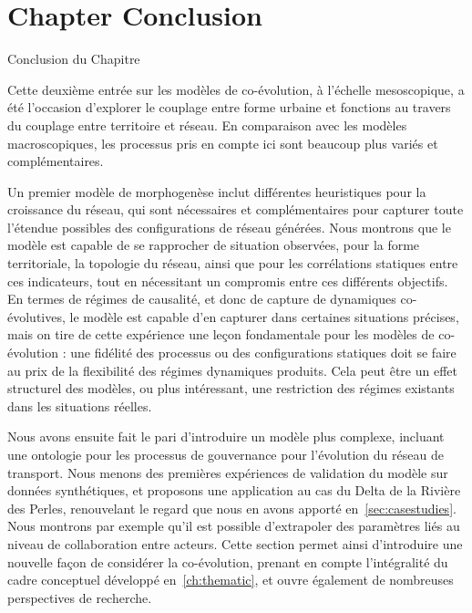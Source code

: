 

\newpage


\section*{Chapter Conclusion}{Conclusion du Chapitre}


Cette deuxième entrée sur les modèles de co-évolution, à l'échelle mesoscopique, a été l'occasion d'explorer le couplage entre forme urbaine et fonctions au travers du couplage entre territoire et réseau. En comparaison avec les modèles macroscopiques, les processus pris en compte ici sont beaucoup plus variés et complémentaires.

Un premier modèle de morphogenèse inclut différentes heuristiques pour la croissance du réseau, qui sont nécessaires et complémentaires pour capturer toute l'étendue possibles des configurations de réseau générées. Nous montrons que le modèle est capable de se rapprocher de situation observées, pour la forme territoriale, la topologie du réseau, ainsi que pour les corrélations statiques entre ces indicateurs, tout en nécessitant un compromis entre ces différents objectifs. En termes de régimes de causalité, et donc de capture de dynamiques co-évolutives, le modèle est capable d'en capturer dans certaines situations précises, mais on tire de cette expérience une leçon fondamentale pour les modèles de co-évolution : une fidélité des processus ou des configurations statiques doit se faire au prix de la flexibilité des régimes dynamiques produits. Cela peut être un effet structurel des modèles, ou plus intéressant, une restriction des régimes existants dans les situations réelles.


Nous avons ensuite fait le pari d'introduire un modèle plus complexe, incluant une ontologie pour les processus de gouvernance pour l'évolution du réseau de transport. Nous menons des premières expériences de validation du modèle sur données synthétiques, et proposons une application au cas du Delta de la Rivière des Perles, renouvelant le regard que nous en avons apporté en~\ref{sec:casestudies}. Nous montrons par exemple qu'il est possible d'extrapoler des paramètres liés au niveau de collaboration entre acteurs. Cette section permet ainsi d'introduire une nouvelle façon de considérer la co-évolution, prenant en compte l'intégralité du cadre conceptuel développé en~\ref{ch:thematic}, et ouvre également de nombreuses perspectives de recherche.




\stars
